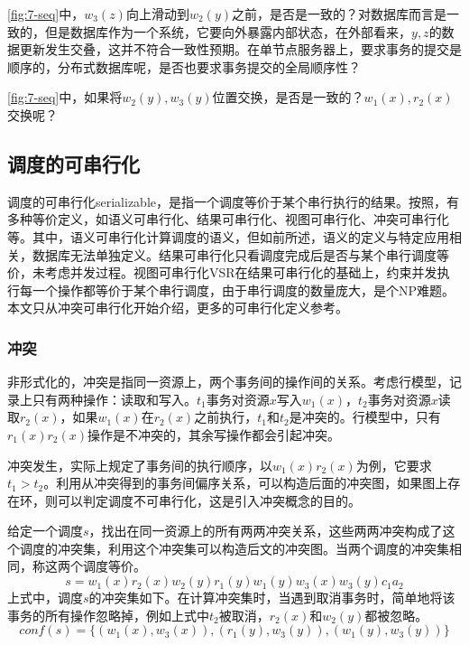 \begin{exercise}
    \figurename\ref{fig:7-seq}中，$w_3(z)$向上滑动到$w_2(y)$之前，是否是一致的？对数据库而言是一致的，但是数据库作为一个系统，它要向外暴露内部状态，在外部看来，$y,z$的数据更新发生交叠，这并不符合一致性预期。在单节点服务器上，要求事务的提交是顺序的，分布式数据库呢，是否也要求事务提交的全局顺序性？
\end{exercise}
\begin{exercise}
    \figurename\ref{fig:7-seq}中，如果将$w_2(y), w_3(y)$位置交换，是否是一致的？$w_1(x), r_2(x)$交换呢？
\end{exercise}

\subsection{调度的可串行化}

调度的可串行化serializable，是指一个调度等价于某个串行执行的结果。按照\cite{Weikum2001Transactional}，有多种等价定义，如语义可串行化、结果可串行化、视图可串行化、冲突可串行化等。其中，语义可串行化计算调度的语义，但如前所述，语义的定义与特定应用相关，数据库无法单独定义。结果可串行化只看调度完成后是否与某个串行调度等价，未考虑并发过程。视图可串行化VSR在结果可串行化的基础上，约束并发执行每一个操作都等价于某个串行调度，由于串行调度的数量庞大，是个NP难题。本文只从冲突可串行化开始介绍，更多的可串行化定义参考\cite{Weikum2001Transactional}。

\subsubsection*{冲突}

非形式化的，冲突是指同一资源上，两个事务间的操作间的关系。考虑行模型，记录上只有两种操作：读取和写入。$t_1$事务对资源$x$写入$w_1(x)$，$t_2$事务对资源$x$读取$r_2(x)$，如果$w_1(x)$在$r_2(x)$之前执行，$t_1$和$t_2$是冲突的。行模型中，只有$r_1(x)r_2(x)$操作是不冲突的，其余写操作都会引起冲突。

冲突发生，实际上规定了事务间的执行顺序，以$w_1(x)r_2(x)$为例，它要求$t_1 > t_2$。利用从冲突得到的事务间偏序关系，可以构造后面的冲突图，如果图上存在环，则可以判定调度不可串行化，这是引入冲突概念的目的。

给定一个调度$s$，找出在同一资源上的所有两两冲突关系，这些两两冲突构成了这个调度的冲突集，利用这个冲突集可以构造后文的冲突图。当两个调度的冲突集相同，称这两个调度等价。
$$
s=w_1(x)r_2(x)w_2(y)r_1(y)w_1(y)w_3(x)w_3(y)c_1a_2
$$
上式中，调度$s$的冲突集如下。在计算冲突集时，当遇到取消事务时，简单地将该事务的所有操作忽略掉，例如上式中$t_2$被取消，$r_2(x)$和$w_2(y)$都被忽略。
$$
conf(s) = \{ (w_1(x),w_3(x)), (r_1(y), w_3(y)), (w_1(y), w_3(y)) \}
$$

